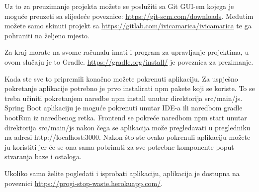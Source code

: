 		Uz to za preuzimanje projekta možete se poslužiti sa Git GUI-em kojega je moguće preuzeti sa slijedeće poveznice: \url{https://git-scm.com/downloads}. Međutim možete samo skinuti projekt sa \url{https://gitlab.com/ivicamarica/ivicamarica} te ga pohraniti na željeno mjesto.
		
		Za kraj morate na svome računalu imati i program za upravljanje projektima, u ovom slučaju je to Gradle. \url{https://gradle.org/install/} je poveznica za prezimanje.
		
		Kada ste sve to pripremili konačno možete pokrenuti aplikaciju. Za uspješno pokretanje aplikacije potrebno je prvo instalirati npm pakete koji se koriste. To se treba učiniti pokretanjem naredbe
		npm install unutar direktorija src/main/js.
		Spring Boot aplikaciju je moguće pokrenuti unutar IDE-a ili naredbom gradle bootRun iz naredbenog retka.
		Frontend se pokreće naredbom npm start unutar direktorija src/main/js nakon čega se aplikacija može pregledavati u pregledniku na adresi http://localhost:3000.
		Nakon što ste ovako pokrenuli aplikaciju možete ju koristiti jer će se ona sama pobrinuti za sve potrebne komponente poput stvaranja baze i ostaloga.
		
		Ukoliko samo želite pogledati i isprobati aplikaciju, aplikacija je dostupna na poveznici  \url{https://progi-stop-waste.herokuapp.com/}.
		
		
		
		
			 
			
			\eject 